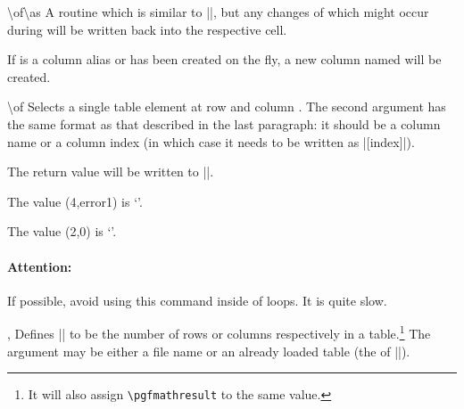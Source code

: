 \documentclass[a4paper]{ltxdoc}
\begin{document}
\begin{command}{\pgfplotstablemodifyeachcolumnelement{}\textbackslash of\textbackslash as}
    A routine which is similar to |\pgfplotstableforeachcolumnelement|, but any
    changes of  which might occur during
     will be written back into the respective cell.
\begin{codeexample}[]
\loadedtable
{}\of\loadedtable\as\cell{%
    \edef\cell{\#\pgfplotstablerow: \cell}%
}
\pgfplotstabletypeset[columns=error1,string type]{\loadedtable}
\end{codeexample}

    If  is a column alias or has been created on the fly, a
    new column named  will be created.
\end{command}

\begin{command}{\pgfplotstablegetelem{}\textbackslash of}
    Selects a single table element at row  and column . The
    second argument has the same format as that described in the last
    paragraph: it should be a column name or a column index (in which case it
    needs to be written as |[index]|).

    The return value will be written to |\pgfplotsretval|.
\begin{codeexample}[]
\of{\loadedtable}
The value (4,error1) is `\pgfplotsretval'.

\of{\loadedtable}
The value (2,0) is `\pgfplotsretval'.
\end{codeexample}

    \paragraph{Attention:}

    If possible, avoid using this command inside of loops. It is quite slow.
\end{command}

\begin{commandlist}{%
    \pgfplotstablegetrowsof{},
    \pgfplotstablegetcolsof{}%
}
    Defines |\pgfplotsretval| to be the number of rows or columns respectively
    in a table.\footnote{It will also assign \texttt{\textbackslash pgfmathresult}
    to the same value.} The argument may be either a file name or an already
    loaded table (the  of |\pgfplotstableread|).
\end{commandlist}
\end{document}
